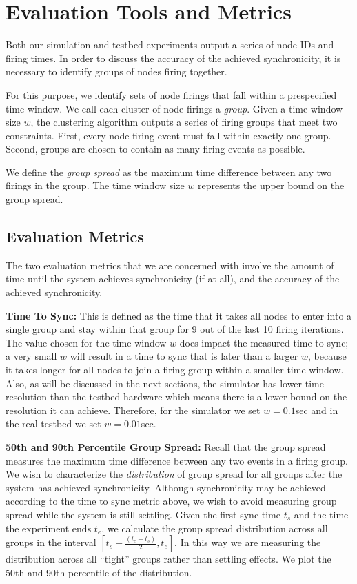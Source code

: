 \documentclass{sig-alternate}
\begin{document}
{\section{Evaluation Tools and Metrics}

Both our simulation and testbed experiments output a series of node
IDs and firing times. In order to discuss the accuracy of the achieved
synchronicity, it is necessary to identify groups of nodes firing
together.

For this purpose, we identify sets of node firings that fall within a
prespecified time window. We call each cluster of node firings a {\em
group}. Given a time window size $w$, the clustering algorithm outputs
a series of firing groups that meet two constraints. First, every node
firing event must fall within exactly one group.  Second, groups are
chosen to contain as many firing events as possible. 

We define the {\em group spread} as the maximum time difference
between any two firings in the group. The time window size $w$
represents the upper bound on the group spread. 

\subsection{Evaluation Metrics}

The two evaluation metrics that we are concerned with involve
the amount of time until the system achieves synchronicity (if at
all), and the accuracy of the achieved synchronicity.

\begin{description}
\item {\bf Time To Sync:} This is defined as the time that it takes
all nodes to enter into a single group and stay within that group for
9 out of the last 10 firing iterations. The value chosen for the time
window $w$ does impact the measured time to sync; a very small $w$
will result in a time to sync that is later than a larger $w$, because
it takes longer for all nodes to join a firing group within a smaller
time window. Also, as will be discussed in the next sections, the
simulator has lower time resolution than the testbed hardware which
means there is a lower bound on the resolution it can
achieve. Therefore, for the simulator we set $w = 0.1$sec and in the
real testbed we set $w = 0.01$sec.

\item{\bf 50th and 90th Percentile Group Spread:} Recall that the
group spread measures the maximum time difference between any two
events in a firing group. We wish to characterize the {\em
distribution} of group spread for all groups after the system has
achieved synchronicity. Although synchronicity may be achieved
according to the time to sync metric above, we wish to avoid measuring
group spread while the system is still settling. Given the first sync
time $t_s$ and the time the experiment ends $t_e$, we calculate the
group spread distribution across all groups in the interval $[t_s +
\frac{(t_e - t_s)}{2}, t_e]$. In this way we are measuring the
distribution across all ``tight'' groups rather than settling
effects. We plot the 50th and 90th percentile of the distribution.


\end{description}}
\end{document}
